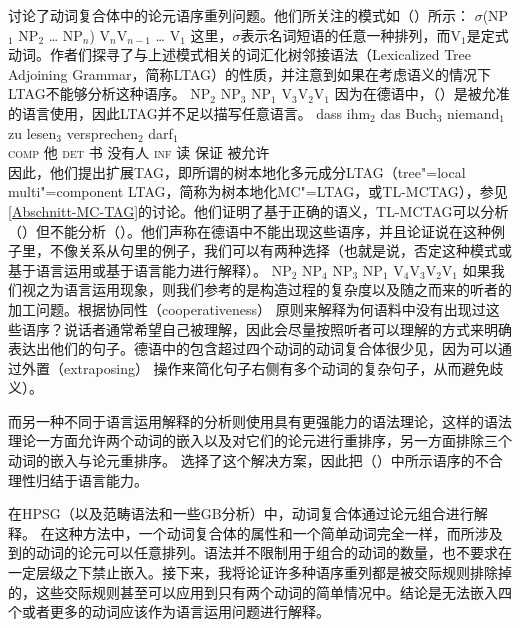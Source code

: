  \citet{JBR2000a}讨论了动词复合体中的论元语序重列问题。他们所关注的模式如（）所示：
\ea
$\sigma$(NP$_1$ NP$_2$ \ldots{} NP$_n$) V$_{n}$V$_{n-1}$ \ldots{} V$_{1}$
\z
这里，$\sigma$表示名词短语的任意一种排列，而V$_{1}$是定式动词。作者们探寻了与上述模式相关的词汇化树邻接语法（Lexicalized Tree Adjoining Grammar，简称LTAG）的性质，并注意到如果在考虑语义的情况下LTAG不能够分析这种语序。
\ea
NP$_2$ NP$_3$ NP$_1$ V$_{3}$V$_{2}$V$_{1}$
\z
因为在德语中，（）是被允准的语言使用，因此LTAG并不足以描写任意语言。
\ea
\gll dass ihm$_2$ das Buch$_3$ niemand$_1$ zu lesen$_3$ versprechen$_2$ darf$_1$\\
     \textsc{comp} 他     \textsc{det} 书 没有人 \textsc{inf} 读 保证 被允许 \\
\z
因此，他们提出扩展TAG，即所谓的树本地化多元成分LTAG（tree"=local multi"=component LTAG，简称为树本地化MC"=LTAG，或TL-MCTAG），参见\ref{Abschnitt-MC-TAG}的讨论。他们证明了基于正确的语义，TL-MCTAG可以分析（）但不能分析（）。他们声称在德语中不能出现这些语序，并且论证说在这种例子里，不像关系从句里的例子，我们可以有两种选择（也就是说，否定这种模式或基于语言运用或基于语言能力进行解释）。
\ea
\label{ex-mc-ltag-fails}
NP$_2$ NP$_4$ NP$_3$ NP$_1$ V$_{4}$V$_{3}$V$_{2}$V$_{1}$
\z
如果我们视之为语言运用现象，则我们参考的是构造过程的复杂度以及随之而来的听者的加工问题。根据协同性（cooperativeness）
原则来解释为何语料中没有出现过这些语序？说话者通常希望自己被理解，因此会尽量按照听者可以理解的方式来明确表达出他们的句子。德语中的包含超过四个动词的动词复合体很少见，因为可以通过外置（extraposing）
操作来简化句子右侧有多个动词的复杂句子，从而避免歧义\citealp[]{MuellerLehrbuch1}）。

而另一种不同于语言运用解释的分析则使用具有更强能力的语法理论，这样的语法理论一方面允许两个动词的嵌入以及对它们的论元进行重排序，另一方面排除三个动词的嵌入与论元重排序。 \citet{JBR2000a}选择了这个解决方案，因此把（）中所示语序的不合理性归结于语言能力。 

在HPSG（以及范畴语法\indexcgc 和一些GB分析\indexgbc）中，动词复合体通过论元组合进行解释\citep{HN89b,HN94a}。 在这种方法中，一个动词复合体的属性和一个简单动词完全一样，而所涉及到的动词的论元可以任意排列。语法并不限制用于组合的动词的数量，也不要求在一定层级之下禁止嵌入。接下来，我将论证许多种语序重列都是被交际规则排除掉的，这些交际规则甚至可以应用到只有两个动词的简单情况中。结论是无法嵌入四个或者更多的动词应该作为语言运用问题进行解释。

